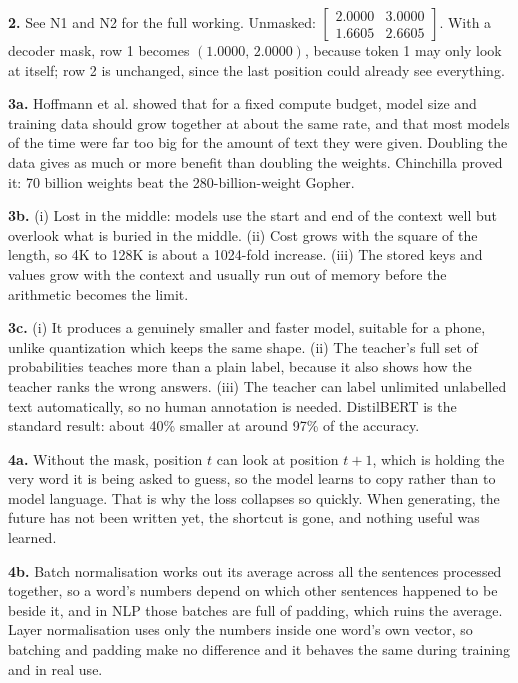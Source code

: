 \documentclass[11pt]{article}
\begin{document}
\textbf{2.} See N1 and N2 for the full working. Unmasked:
$\begin{bmatrix}2.0000 & 3.0000\\ 1.6605 & 2.6605\end{bmatrix}$. With a decoder mask, row 1
becomes $(1.0000,\,2.0000)$, because token 1 may only look at itself; row 2 is unchanged,
since the last position could already see everything.

\textbf{3a.} Hoffmann et al. showed that for a fixed compute budget, model size and training
data should grow together at about the same rate, and that most models of the time were far
too big for the amount of text they were given. Doubling the data gives as much or more
benefit than doubling the weights. Chinchilla proved it: 70 billion weights beat the
280-billion-weight Gopher.

\textbf{3b.} (i) Lost in the middle: models use the start and end of the context well but
overlook what is buried in the middle. (ii) Cost grows with the square of the length, so 4K to
128K is about a 1024-fold increase. (iii) The stored keys and values grow with the context and
usually run out of memory before the arithmetic becomes the limit.

\textbf{3c.} (i) It produces a genuinely smaller and faster model, suitable for a phone,
unlike quantization which keeps the same shape. (ii) The teacher's full set of probabilities
teaches more than a plain label, because it also shows how the teacher ranks the wrong
answers. (iii) The teacher can label unlimited unlabelled text automatically, so no human
annotation is needed. DistilBERT is the standard result: about 40\% smaller at around 97\% of
the accuracy.

\textbf{4a.} Without the mask, position $t$ can look at position $t+1$, which is holding the
very word it is being asked to guess, so the model learns to copy rather than to model
language. That is why the loss collapses so quickly. When generating, the future has not been
written yet, the shortcut is gone, and nothing useful was learned.

\textbf{4b.} Batch normalisation works out its average across all the sentences processed
together, so a word's numbers depend on which other sentences happened to be beside it, and in
NLP those batches are full of padding, which ruins the average. Layer normalisation uses only
the numbers inside one word's own vector, so batching and padding make no difference and it
behaves the same during training and in real use.
\end{document}
